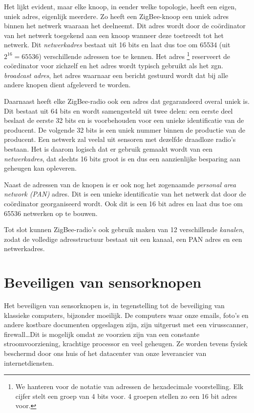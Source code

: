 Het lijkt evident, maar elke knoop, in eender welke topologie, heeft een eigen,
uniek adres, eigenlijk meerdere. Zo heeft een ZigBee-knoop een uniek adres
binnen het netwerk waaraan het deelneemt. Dit adres wordt door de co\"ordinator
van het netwerk toegekend aan een knoop wanneer deze toetreedt tot het netwerk.
Dit \emph{netwerkadres} bestaat uit 16 bits en laat dus toe om 65534 (uit
$2^{16} = 65536$) verschillende adressen toe te kennen. Het adres
\footnote{We hanteren voor de notatie van adressen de hexadecimale
voorstelling. Elk cijfer stelt een groep van 4 bits voor. 4 groepen stellen zo
een 16 bit adres voor.} reserveert de co\"ordinator voor zichzelf en het adres
 wordt typisch gebruikt als het zgn. \emph{broadcast adres}, het
adres waarnaar een bericht gestuurd wordt dat bij alle andere knopen dient
afgeleverd te worden.

Daarnaast heeft elke ZigBee-radio ook een adres dat gegarandeerd overal uniek
is. Dit bestaat uit 64 bits en wordt samengesteld uit twee delen: een eerste
deel beslaat de eerste 32 bits en is voorbehouden voor een unieke identificatie
van de producent. De volgende 32 bits is een uniek nummer binnen de productie
van de producent. Een netwerk zal veelal uit sensoren met dezelfde draadloze
radio's bestaan. Het is daarom logisch dat er gebruik gemaakt wordt van een
\emph{netwerkadres}, dat slechts 16 bits groot is en dus een aanzienlijke
besparing aan geheugen kan opleveren.

Naast de adressen van de knopen is er ook nog het zogenaamde \emph{personal
area network (PAN)} adres. Dit is een unieke identificatie van het netwerk dat
door de co\"ordinator georganiseerd wordt. Ook dit is een 16 bit adres en laat
dus toe om 65536 netwerken op te bouwen.

Tot slot kunnen ZigBee-radio's ook gebruik maken van 12 verschillende
\emph{kanalen}, zodat de volledige adresstructuur bestaat uit een kanaal, een
PAN adres en een netwerkadres.

\section{Beveiligen van sensorknopen}
\label{section:beveiligen}

Het beveiligen van sensorknopen is, in tegenstelling tot de beveiliging van
klassieke computers, bijzonder moeilijk. De computers waar onze emails, foto's
en andere kostbare documenten opgeslagen zijn, zijn uitgerust met een
virusscanner, firewall\dots Dit is mogelijk omdat ze voorzien zijn van een
constante stroomvoorziening, krachtige processor en veel geheugen. Ze worden
tevens fysiek beschermd door ons huis of het datacenter van onze leverancier
van internetdiensten.

